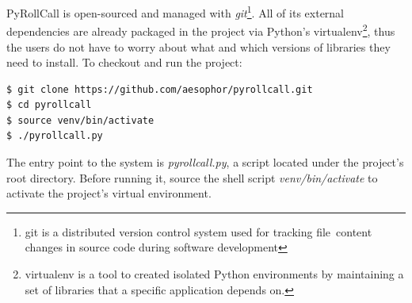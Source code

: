 PyRollCall is open-sourced and managed with \emph{git}\footnote{git is a distributed version control system used for tracking file\
  content changes in source code during software development}. All of its external dependencies are already packaged
in the project via Python's {virtualenv}\footnote{virtualenv is a tool to created isolated Python environments by maintaining a set of libraries that a specific application depends on.},
thus the users do not have to worry about what and which versions of libraries they need to install. To checkout and run the project:

\begin{lstlisting}[numbers=none,xleftmargin=0em,caption={Shell commands to checkout and run PyRollCall}]
$ git clone https://github.com/aesophor/pyrollcall.git
$ cd pyrollcall
$ source venv/bin/activate
$ ./pyrollcall.py 
\end{lstlisting}

The entry point to the system is \emph{pyrollcall.py}, a script located under the project's root directory.
Before running it, source the shell script \emph{venv/bin/activate} to activate the project's virtual environment.
